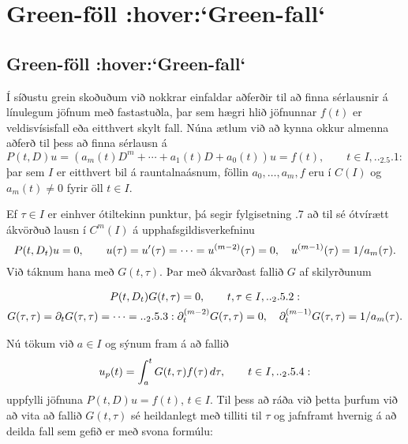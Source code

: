 \section{Green-föll :hover:`Green-fall`}

\subsection{Green-föll :hover:`Green-fall`}

\noindent
Í síðustu grein skoðuðum við nokkrar einfaldar aðferðir til að finna
sérlausnir á línulegum jöfnum með fastastuðla, þar sem hægri hlið
jöfnunnar $f(t)$ er veldisvísisfall eða eitthvert skylt fall.  Núna
ætlum við að kynna okkur almenna aðferð til þess að 
finna sérlausn á
 \begin{equation*}P(t,D)u=(a_m(t)D^m+\cdots+a_1(t)D+a_0(t))u=f(t), \qquad
t\in I,


.. _2.5.1:

 \end{equation*}
þar sem $I$ er eitthvert bil á rauntalnaásnum, föllin $a_0,
\dots,a_m,f$ eru í $C(I)$ og $a_m(t)\neq 0$ fyrir öll $t\in I$.  

Ef $\tau\in I$ er einhver ótiltekinn punktur, þá segir fylgisetning .7 að til sé ótvírætt ákvörðuð lausn í $C^m(I)$ á
upphafs\-gildis\-verk\-efninu 
 $$P(t,D_t)u=0, \qquad
u(\tau)=u{\sp{\prime}}(\tau)=\cdots=u\sp{(m-2)}(\tau)=0, \quad 
u\sp{(m-1)}(\tau)=1/a_m({\tau}). 
 $$
Við táknum hana með $G(t,\tau)$.  Þar með ákvarðast fallið $G$ af
skilyrðunum 
 
\begin{gather*}
P(t,D_t)G(t,\tau)=0,  \qquad t,\tau\in I,

.. _2.5.2:
\\
G(\tau,\tau)=\partial_tG(\tau,\tau)=\cdots=

.. _2.5.3:

\partial_t\sp{(m-2)}G(\tau,\tau)=0, \quad
\partial_t\sp{(m-1)}G(\tau,\tau)=1/a_m({\tau}). 
\end{gather*}
 
Nú tökum við $a\in I$ og sýnum fram á
að fallið 
\begin{equation*}
u_p(t) = \int_a\sp t G(t,\tau)f(\tau) \, d\tau, \qquad t\in I,

.. _2.5.4:

\end{equation*}
uppfylli jöfnuna $P(t,D)u=f(t)$, $t\in I$.
Til þess að ráða við þetta þurfum við að vita að fallið $G(t,\tau)$
sé heildanlegt með tilliti til $\tau$ og jafnframt hvernig á að deilda
fall sem gefið er með svona formúlu:


